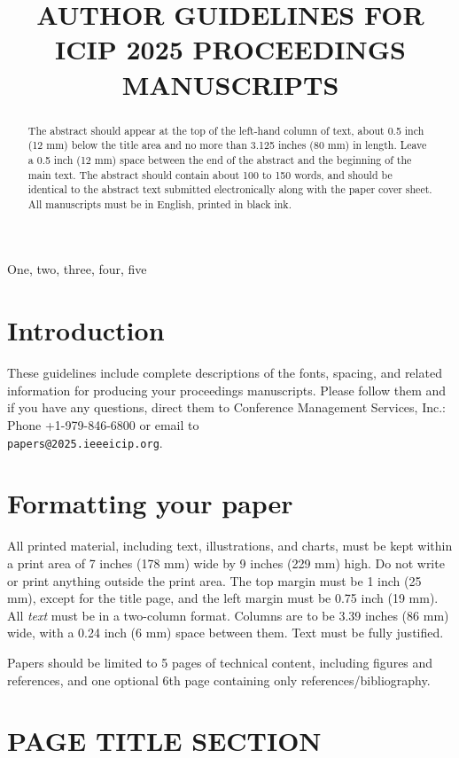 \documentclass{article}
\title{AUTHOR GUIDELINES FOR ICIP 2025 PROCEEDINGS MANUSCRIPTS}
\begin{document}
%
\maketitle
%
\begin{abstract}
The abstract should appear at the top of the left-hand column of text, about
0.5 inch (12 mm) below the title area and no more than 3.125 inches (80 mm) in
length.  Leave a 0.5 inch (12 mm) space between the end of the abstract and the
beginning of the main text.  The abstract should contain about 100 to 150
words, and should be identical to the abstract text submitted electronically
along with the paper cover sheet.  All manuscripts must be in English, printed
in black ink.
\end{abstract}
%
\begin{keywords}
One, two, three, four, five
\end{keywords}
%
\section{Introduction}
\label{sec:intro}

These guidelines include complete descriptions of the fonts, spacing, and
related information for producing your proceedings manuscripts. Please follow
them and if you have any questions, direct them to Conference Management
Services, Inc.: Phone +1-979-846-6800 or email
to \\\texttt{papers@2025.ieeeicip.org}.

\section{Formatting your paper}
\label{sec:format}

All printed material, including text, illustrations, and charts, must be kept
within a print area of 7 inches (178 mm) wide by 9 inches (229 mm) high. Do
not write or print anything outside the print area. The top margin must be 1
inch (25 mm), except for the title page, and the left margin must be 0.75 inch
(19 mm).  All {\it text} must be in a two-column format. Columns are to be 3.39
inches (86 mm) wide, with a 0.24 inch (6 mm) space between them. Text must be
fully justified.

Papers should be limited to 5 pages of technical content, including figures and references,
and one optional 6th page containing only references/bibliography.

\section{PAGE TITLE SECTION}
\label{sec:pagestyle}
\end{document}
